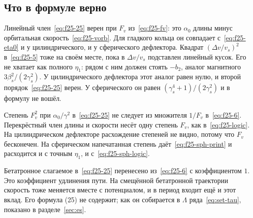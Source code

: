 \subsection{Что в формуле верно}
\label{sec:f25-what}

Линейный член~\eqref{eq:f25-25} верен при $F_v$ из~\eqref{eq:f25-fv}: это $\alpha_0$ длины минус орбитальная скорость~\eqref{eq:f25-vorb}. Для гладкого кольца он совпадает с~\eqref{eq:f25-eta0} и у цилиндрического, и у сферического дефлектора. Квадрат $(\Delta v/v_s)^2$ в~\eqref{eq:f25-5} тоже на своём месте, пока в $\Delta v/v_s$ подставлен линейный кусок. Его не хватает как полного $\eta_1$: рядом с ним должен стоять $-b_2$, аналог магнитного $3\beta_s^2/(2\gamma_s^2)$. У цилиндрического дефлектора этот аналог равен нулю, и второй порядок~\eqref{eq:f25-25} верен. У сферического он равен $(\gamma_s^4+1)/(2\gamma_s^2)$ и в формулу не вошёл.

Степень $F_v^2$ при $\alpha_0/\gamma^2$ в~\eqref{eq:f25-25} не следует из множителя $1/F_v$ в~\eqref{eq:f25-6}. Перекрёстный член длины и скорости несёт одну степень $F_v$, как в~\eqref{eq:f25-logic}. На цилиндрическом дефлекторе расхождение степеней не видно, потому что $F_v$ бесконечен. На сферическом напечатанная степень даёт~\eqref{eq:f25-sph-print} и расходится и с точным $\eta_1$, и с~\eqref{eq:f25-sph-logic}.

Бетатронное слагаемое в~\eqref{eq:f25-25} перенесено из~\eqref{eq:f25-6} с коэффициентом $1$. Это коэффициент удлинения пути. На смещённой бетатронной траектории скорость тоже меняется вместе с потенциалом, и в период входит ещё и этот вклад. Его формула (25) не содержит; как он собирается в $\Lambda$ ряда~\eqref{eq:set-tau}, показано в разделе~\ref{sec:es}.

